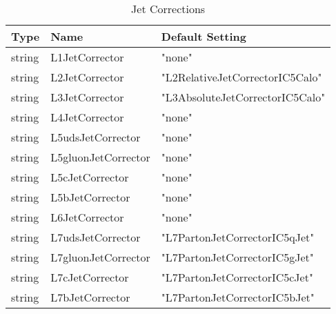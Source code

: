 \documentclass{cmspaper}
\begin{document}
\begin{appendix}
\begin{table}[h]
\caption{Jet Corrections}
\begin{center}
\begin{tabular}{l|l|l}
\textbf{Type} & \textbf{Name} & \textbf{Default Setting}       \\\hline
string &L1JetCorrector       & "none"                          \\\hline 
string & L2JetCorrector      & "L2RelativeJetCorrectorIC5Calo" \\\hline
string & L3JetCorrector      & "L3AbsoluteJetCorrectorIC5Calo" \\\hline
string & L4JetCorrector      & "none"                          \\\hline
string & L5udsJetCorrector   & "none"                          \\\hline
string & L5gluonJetCorrector & "none"                          \\\hline
string & L5cJetCorrector     & "none"                          \\\hline
string & L5bJetCorrector     & "none"                          \\\hline
string & L6JetCorrector      & "none"                          \\\hline
string & L7udsJetCorrector   & "L7PartonJetCorrectorIC5qJet"   \\\hline
string & L7gluonJetCorrector & "L7PartonJetCorrectorIC5gJet"   \\\hline
string & L7cJetCorrector     & "L7PartonJetCorrectorIC5cJet"   \\\hline
string & L7bJetCorrector     & "L7PartonJetCorrectorIC5bJet" 
\end{tabular}
\end{center}
\label{tab:JetCorrections}
\end{table}


\end{appendix}
\end{document}
